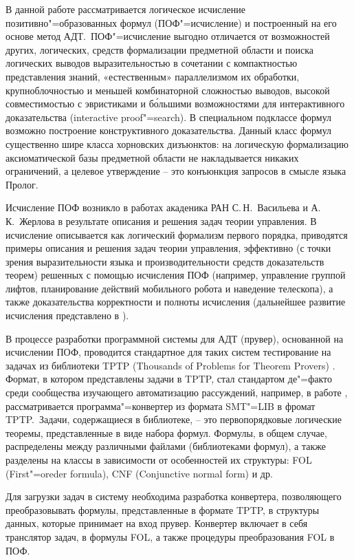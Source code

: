 \documentclass[a4paper]{jctart15b}
\begin{document}
В данной работе рассматривается логическое исчисление позитивно"=образованных формул (ПОФ"=исчисление) и построенный на его основе метод АДТ.~ПОФ"=исчисление выгодно отличается от возможностей других, логических, средств формализации предметной области и поиска логических выводов выразительностью в сочетании с компактностью представления знаний, «естественным» параллелизмом их обработки, крупноблочностью и меньшей комбинаторной сложностью выводов, высокой совместимостью с эвристиками и б\'ольшими возможностями для интерактивного доказательства (interactive proof"=search). В специальном подклассе формул возможно построение конструктивного доказательства. Данный класс формул существенно шире класса хорновских дизъюнктов: на логическую формализацию аксиоматической базы предметной области не накладывается никаких ограничений, а целевое утверждение -- это конъюнкция запросов в смысле языка Пролог.

Исчисление ПОФ возникло в работах акаденика РАН С.\,Н.~Васильева и А.\,К.~Жерлова \cite{SNV1990,ICDS2000} в результате описания и решения задач теории управления. В \cite{ICDS2000} исчисление описывается как логический формализм первого порядка, приводятся примеры описания и решения задач теории управления, эффективно (с точки зрения выразительности языка и производительности средств доказательств теорем) решенных с помощью исчисления ПОФ (например, управление группой лифтов, планирование действий мобильного робота и наведение телескопа), а также доказательства корректности и полноты исчисления (дальнейшее развитие исчисления представлено в \cite{jour2}).

В процессе разработки программной системы для АДТ \cite{mipro2013} (прувер), основанной на исчислении ПОФ, проводится стандартное для таких систем тестирование на задачах из библиотеки TPTP (Thousands of Problems for Theorem Provers) \cite{tptp}. Формат, в котором представлены задачи в TPTP, стал стандартом де"=факто среди сообщества изучающего автоматизацию рассуждений, например, в работе \cite{SMTtoTPTP}, рассматривается программа"=конвертер из формата SMT"=LIB в фромат TPTP.~Задачи, содержащиеся в библиотеке, -- это первопорядковые логические теоремы, представленные в виде набора формул. Формулы, в общем случае, распределены между различными файлами (библиотеками формул), а также разделены на классы в зависимости от особенностей их структуры: FOL (First"=oreder formula), CNF (Conjunctive normal form) и др.

Для загрузки задач в систему необходима разработка конвертера, позволяющего преобразовывать формулы, представленные в формате TPTP, в структуры данных, которые принимает на вход прувер. Конвертер включает в себя транслятор задач, в формулы FOL, а также процедуры преобразования FOL в ПОФ.
\end{document}
